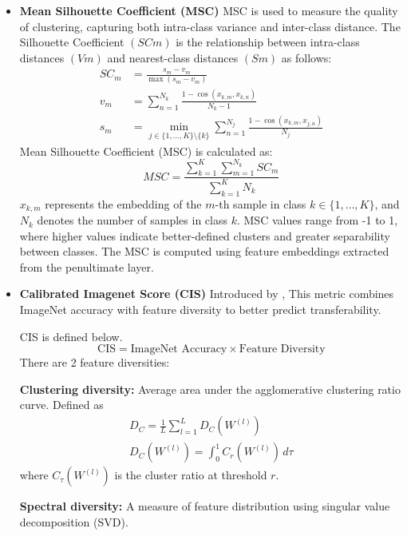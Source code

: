 \documentclass[10pt,twocolumn]{article}
\begin{document}
\begin{itemize} [topsep=3pt, itemsep=2pt, parsep=1pt]
Here, $\mathbf{x}_{k,m}$ represents the embedding of the $m$-th sample in class $k \in \{1, \dots, K\}$, and $N_k$ denotes the number of samples in class $k$.

\item \textbf{Mean Silhouette Coefficient (MSC)}\cite{rousseeuw_silhouettes_1987} 
MSC is used to measure the quality of clustering, capturing both intra-class variance and inter-class distance. The Silhouette Coefficient $(SCm)$ is the relationship between intra-class distances $(Vm)$ and nearest-class distances $(Sm)$ as follows:
\begin{align*}
SC_m &= \frac{s_m - v_m}{\max(s_m - v_m)} \\
v_m &= \sum_{n=1}^{N_k} \frac{1 - \cos(x_{k,m}, x_{k,n})}{N_k - 1} \\
s_m &= \min_{j \in \{1,\ldots,K\} \setminus \{k\}} \sum_{n=1}^{N_j} \frac{1 - \cos(x_{k,m}, x_{j,n})}{N_j}
\end{align*}
Mean Silhouette Coefficient (MSC) is calculated as:
\[
MSC = \frac{\sum_{k=1}^{K} \sum_{m=1}^{N_k} SC_m}{\sum_{k=1}^{K} N_k}
\]
\(x_{k,m}\) represents the embedding of the \(m\)-th sample in class \(k \in \{1,\ldots,K\}\), and \(N_k\) denotes the number of samples in class \(k\). MSC values range from -1 to 1, where higher values indicate better-defined clusters and greater separability between classes. The MSC is computed using feature embeddings extracted from the penultimate layer.

\item \textbf{Calibrated Imagenet Score (CIS)} 
Introduced by \cite{nayman_diverse_2022}, This metric combines ImageNet accuracy with feature diversity to better predict transferability. 

CIS is defined below.
\[
\text{CIS} = \text{ImageNet Accuracy} \times \text{Feature Diversity}
\] 
There are 2 feature diversities:

\textbf{Clustering diversity:} Average area under the agglomerative clustering ratio curve.  
Defined as  
\begin{align*}
D_C = \frac{1}{L} \sum_{l=1}^L D_C(W^{(l)}) \\ 
D_C(W^{(l)}) = \int_0^1 C_r(W^{(l)}) \, d\tau
\end{align*}
where \(C_\tau(W^{(l)})\) is the cluster ratio at threshold \(r\).

\vspace{1em}

\textbf{Spectral diversity:} A measure of feature distribution using singular value decomposition (SVD).  


\end{itemize}
\end{document}
